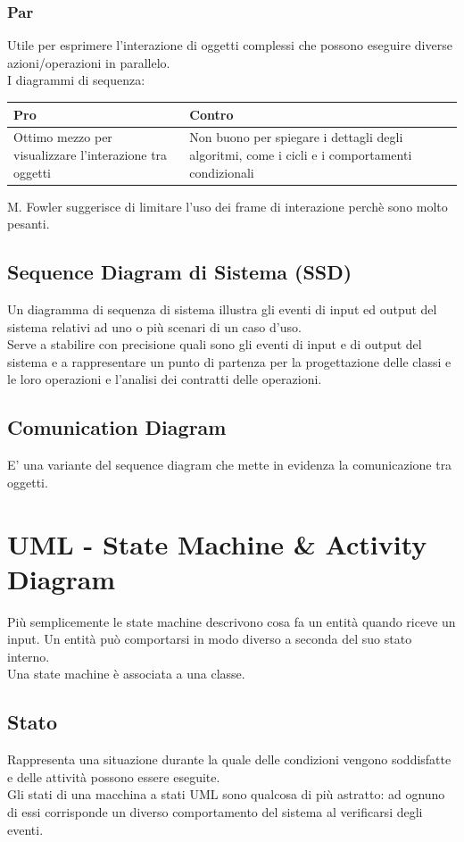 \documentclass[12pt, a4paper]{report}
\begin{document}
\subsection{Par}
Utile per esprimere l'interazione di oggetti complessi che possono eseguire diverse azioni/operazioni in parallelo.\\
I diagrammi di sequenza:
\begin{center}
    \begin{tabular}{| p{8cm} | p{8cm} |}
        \hline
        \textbf{Pro} & \textbf{Contro} \\
        \hline
        Ottimo mezzo per visualizzare l'interazione tra oggetti & Non buono per spiegare i dettagli degli algoritmi, come i cicli e i comportamenti condizionali \\
        \hline
    \end{tabular}
\end{center}
M. Fowler suggerisce di limitare l'uso dei frame di interazione perchè sono molto pesanti.
\section{Sequence Diagram di Sistema (SSD)}
Un diagramma di sequenza di sistema illustra gli eventi di input ed output del sistema relativi ad uno o più scenari di un caso d'uso.\\
Serve a stabilire con precisione quali sono gli eventi di input e di output del sistema e a rappresentare un punto di partenza per la progettazione delle classi e le loro operazioni e l'analisi dei contratti delle operazioni.
\section{Comunication Diagram}
E' una variante del sequence diagram che mette in evidenza la comunicazione tra oggetti.
\chapter{UML - State Machine \& Activity Diagram}
Più semplicemente le state machine descrivono cosa fa un entità quando riceve un input. Un entità può comportarsi in modo diverso a seconda del suo stato interno.\\
Una state machine è associata a una classe.
\section{Stato}
Rappresenta una situazione durante la quale delle condizioni vengono soddisfatte e delle attività possono essere eseguite.\\
Gli stati di una macchina a stati UML sono qualcosa di più astratto: ad ognuno di essi corrisponde un diverso comportamento del sistema al verificarsi degli eventi.
\end{document}
